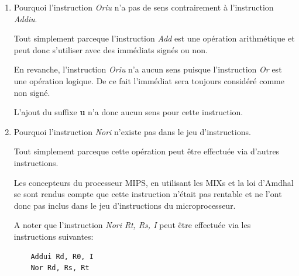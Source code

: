 {\begin{enumerate}
\begin{correction}
      Ainsi l'adresse suivante est calcul\'ee de la mani\`ere suivante:

      \begin{verbatim}
	instruction address = branchment instruction address + 4 +
                      immediate << 2
      \end{verbatim}

      ce qui est \'equivalent \`a:

      \begin{verbatim}
	instruction address = current instruction address + immediate << 2
      \end{verbatim}

    \end{correction}
  \item
    Pourquoi l'instruction \textit{Oriu} n'a pas de sens contrairement
    \`a l'instruction \textit{Addiu}.

    \begin{correction}

      Tout simplement parceque l'instruction \textit{Add} est une
      op\'eration arithm\'etique et peut donc s'utiliser avec des
      imm\'ediats sign\'es ou non.

      En revanche, l'instruction \textit{Oriu} n'a aucun sens puisque
      l'instruction \textit{Or} est une op\'eration logique. De ce fait
      l'imm\'ediat sera toujours consid\'er\'e comme non sign\'e.

      L'ajout du suffixe \textbf{u} n'a donc aucun sens pour cette instruction.

    \end{correction}
  \item
    Pourquoi l'instruction \textit{Nori} n'existe pas dans le jeu
    d'instructions.

    \begin{correction}

      Tout simplement parceque cette op\'eration peut \^etre effectu\'ee
      via d'autres instructions.

      Les concepteurs du processeur MIPS, en utilisant les MIXs et la
      loi d'Amdhal se sont rendus compte que cette instruction n'\'etait
      pas rentable et ne l'ont donc pas inclus dans le jeu d'instructions
      du microprocesseur.

      A noter que l'instruction \textit{Nori Rt, Rs, I} peut
      \^etre effectu\'ee via les instructions suivantes:

      \begin{verbatim}
	Addui Rd, R0, I
	Nor Rd, Rs, Rt
      \end{verbatim}


\end{correction}
\end{enumerate}}
